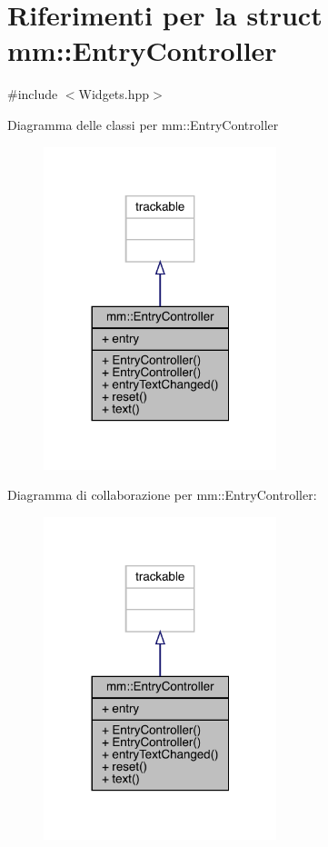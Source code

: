 \hypertarget{structmm_1_1_entry_controller}{}\section{Riferimenti per la struct mm\+:\+:Entry\+Controller}
\label{structmm_1_1_entry_controller}


{\ttfamily \#include $<$Widgets.\+hpp$>$}



Diagramma delle classi per mm\+:\+:Entry\+Controller
\nopagebreak
\begin{figure}[H]
\begin{center}
\leavevmode
\includegraphics[width=192pt]{d1/d7d/structmm_1_1_entry_controller__inherit__graph}
\end{center}
\end{figure}


Diagramma di collaborazione per mm\+:\+:Entry\+Controller\+:
\nopagebreak
\begin{figure}[H]
\begin{center}
\leavevmode
\includegraphics[width=192pt]{db/db6/structmm_1_1_entry_controller__coll__graph}
\end{center}
\end{figure}
